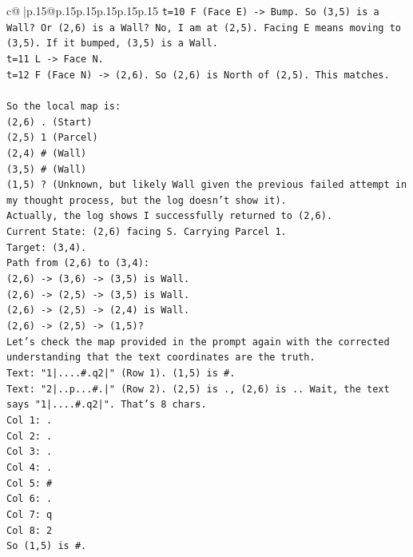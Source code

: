\documentclass{article}
\begin{document}
{\begin{supertabular}{c@{$\;$}|p{.15\linewidth}@{}p{.15\linewidth}p{.15\linewidth}p{.15\linewidth}p{.15\linewidth}p{.15\linewidth}}
{{{\texttt{t=10 F (Face E) {-}> Bump. So (3,5) is a Wall? Or (2,6) is a Wall? No, I am at (2,5). Facing E means moving to (3,5). If it bumped, (3,5) is a Wall.} \\
\texttt{t=11 L {-}> Face N.} \\
\texttt{t=12 F (Face N) {-}> (2,6). So (2,6) is North of (2,5). This matches.} \\
\\ 
\texttt{So the local map is:} \\
\texttt{(2,6) . (Start)} \\
\texttt{(2,5) 1 (Parcel)} \\
\texttt{(2,4) \# (Wall)} \\
\texttt{(3,5) \# (Wall)} \\
\texttt{(1,5) ? (Unknown, but likely Wall given the previous failed attempt in my thought process, but the log doesn't show it).} \\
\texttt{Actually, the log shows I successfully returned to (2,6).} \\
\texttt{Current State: (2,6) facing S. Carrying Parcel 1.} \\
\texttt{Target: (3,4).} \\
\texttt{Path from (2,6) to (3,4):} \\
\texttt{(2,6) {-}> (3,6) {-}> (3,5) is Wall.} \\
\texttt{(2,6) {-}> (2,5) {-}> (3,5) is Wall.} \\
\texttt{(2,6) {-}> (2,5) {-}> (2,4) is Wall.} \\
\texttt{(2,6) {-}> (2,5) {-}> (1,5)?} \\
\texttt{Let's check the map provided in the prompt again with the corrected understanding that the text coordinates are the truth.} \\
\texttt{Text: "1|....\#.q2|" (Row 1). (1,5) is \#.} \\
\texttt{Text: "2|..p...\#.|" (Row 2). (2,5) is ., (2,6) is .. Wait, the text says "1|....\#.q2|". That's 8 chars.} \\
\texttt{Col 1: .} \\
\texttt{Col 2: .} \\
\texttt{Col 3: .} \\
\texttt{Col 4: .} \\
\texttt{Col 5: \#} \\
\texttt{Col 6: .} \\
\texttt{Col 7: q} \\
\texttt{Col 8: 2} \\
\texttt{So (1,5) is \#.} \\
}}}
\end{supertabular}}
\end{document}
